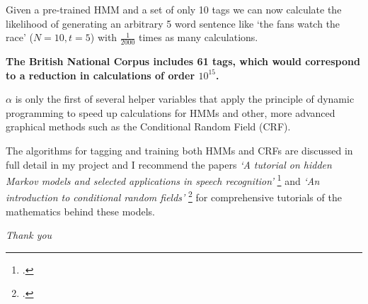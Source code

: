 \documentclass[envcountsect]{beamer}
\begin{document}
\begin{frame}



Given a pre-trained HMM and a set of only 10 tags we can now calculate the likelihood of generating an arbitrary 5 word sentence like `the fans watch the race' ($N=10,t=5$) with $\frac{1}{2000}$ times as many calculations.

\pause
\vspace{0.5cm}

\textbf{The British National Corpus includes 61 tags, which would correspond to a reduction in calculations of order $10^{15}$.}

\pause

\vspace{0.5cm}

$\alpha$ is only the first of several helper variables that apply the principle of dynamic programming to speed up calculations for HMMs and other, more advanced graphical methods such as the Conditional Random Field (CRF).

\pause

\vspace{0.5cm}

The algorithms for tagging and training both HMMs and CRFs are discussed in full detail in my project and I recommend the papers \textit{`A tutorial on hidden Markov models and selected applications in speech recognition'} \footcite{rabiner-1989-tutorial} and \textit{`An introduction to conditional random fields'} \footcite{sutton-2012-crfintro} for comprehensive tutorials of the mathematics behind these models.

\end{frame}

\begin{frame}
\centering \Huge
\emph{Thank you}
\end{frame}
\end{document}
